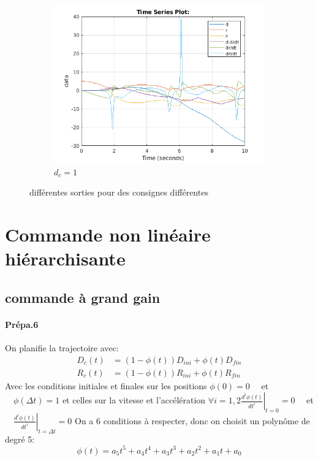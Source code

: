\documentclass[10pt,a4paper,notitlepage]{article}
\begin{document}
\begin{figure}[H]
\begin{subfigure}{0.5\textwidth}
  \includegraphics[width=\linewidth]{NL_correcL1.png}
  \caption{$d_c=1$}
  \label{fig:label}
\end{subfigure}
\caption{différentes sorties pour des consignes différentes}
\label{fig:dc_var}
\end{figure}






\section{Commande non linéaire hiérarchisante}
\subsection{commande à grand gain}
\paragraph{Prépa.6} On planifie la trajectoire avec:
\begin{equation}
  \begin{aligned} D_{c}(t) &=(1-\phi(t)) D_{i n i}+\phi(t) D_{f i n} \\
    R_{c}(t) &=(1-\phi(t)) R_{i n i}+\phi(t) R_{f i n}
  \end{aligned}
\end{equation}
Avec les conditions initiales et finales sur les positions
$\phi(0)=0 \quad$ et $\quad \phi(\Delta t)=1$
et celles sur la vitesse et l'accélération
$\forall i=1,2\left.\frac{d^{i} \phi(t)}{d t^{i}}\right|_{t=0}=0 \quad$ et $\quad\left.\frac{d^{i} \phi(t)}{d t^{i}}\right|_{t=\Delta t}=0$
On a 6 conditions à respecter, donc on choisit un polynôme de degré 5:
\[
  \phi(t) = a_5 t^5 + a_4 t^4 +a_3 t^3 + a_2 t^2+a_1 t+ a_0
\]
\end{document}

